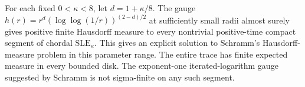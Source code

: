For each fixed $0<\kappa<8$, let $d=1+\kappa/8$.
The gauge $h(r)=r^d(\log\log(1/r))^{(2-d)/2}$ at sufficiently small
radii almost surely gives positive finite Hausdorff measure to every
nontrivial positive-time compact segment of chordal $\mathrm{SLE}_\kappa$.
This gives an explicit solution to Schramm's Hausdorff-measure problem
in this parameter range. The entire trace has finite expected measure
in every bounded disk. The exponent-one iterated-logarithm gauge
suggested by Schramm is not sigma-finite on any such segment.
